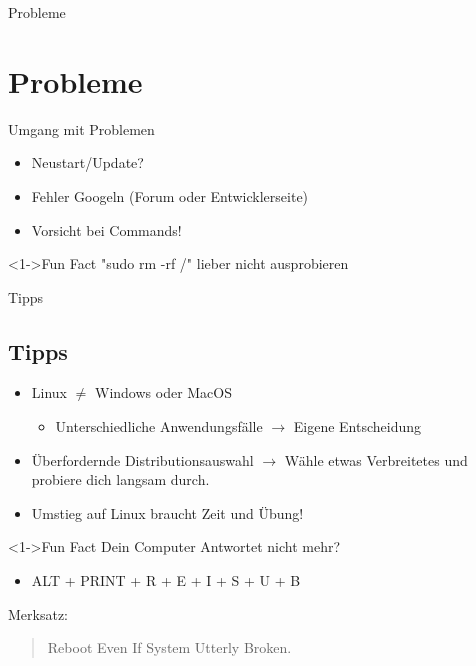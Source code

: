 
\begin{frame}{Probleme}
    \section{Probleme}\label{sec:probleme}

\end{frame}

\begin{frame}{Umgang mit Problemen}

    \begin{itemize}
        \item<3-> Neustart/Update?
        \item<4-> Fehler Googeln (Forum oder Entwicklerseite)
        \item<5-> Vorsicht bei Commands!
    \end{itemize}

    \vspace{0.5cm}
    \begin{exampleblock}<1->{Fun Fact}
        "sudo rm -rf /" lieber nicht ausprobieren
    \end{exampleblock}

\end{frame}

\begin{frame}{Tipps}
    \subsection{Tipps}\label{subsec:tipps}

    \begin{itemize}
        \item<2-> Linux $\neq$ Windows oder MacOS
        \begin{itemize}
            \item <3-> Unterschiedliche Anwendungsfälle $\longrightarrow$ Eigene Entscheidung
        \end{itemize}
        \item<4-> Überfordernde Distributionsauswahl $\longrightarrow$ Wähle etwas Verbreitetes und probiere dich langsam durch.
        \item<5-> Umstieg auf Linux braucht Zeit und Übung!
    \end{itemize}

    \vspace{0.5cm}
    \begin{exampleblock}<1->{Fun Fact}
        Dein Computer Antwortet nicht mehr?
        \begin{itemize}
            \item ALT + PRINT + R + E + I + S + U + B
        \end{itemize}
        Merksatz:
        \begin{quote}
            Reboot Even If System Utterly Broken.
        \end{quote}
    \end{exampleblock}

\end{frame}
